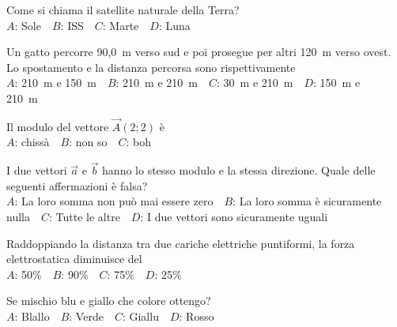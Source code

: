 \def\mcquestionnumber{8}


\mcquestionheader Come si chiama il satellite naturale della Terra?\\
{$A$}: Sole\ \ {$B$}: ISS\ \ {$C$}: Marte\ \ {$D$}: Luna\ \ 

\mcquestionfooter



\def\mcquestionnumber{9}


\mcquestionheader Un gatto percorre 90,0~m verso sud e poi prosegue per altri 120~m verso ovest. Lo spostamento e la distanza percorsa sono rispettivamente\\
{$A$}: 210~m e 150~m\ \ {$B$}: 210~m e 210~m\ \ {$C$}: 30~m e 210~m\ \ {$D$}: 150~m e 210~m\ \ 

\mcquestionfooter



\def\mcquestionnumber{10}


\mcquestionheader Il modulo del vettore $\vec{A}(2;2)$ è\\
{$A$}: chissà\ \ {$B$}: non so\ \ {$C$}: boh\ \ 

\mcquestionfooter



\def\mcquestionnumber{11}


\mcquestionheader I due vettori $\vec{a}$ e $\vec{b}$ hanno lo stesso modulo e la stessa direzione. Quale delle seguenti affermazioni è falsa?\\
{$A$}: La loro somma non può mai essere zero\ \ {$B$}: La loro somma è sicuramente nulla\ \ {$C$}: Tutte le altre\ \ {$D$}: I due vettori sono sicuramente uguali\ \ 

\mcquestionfooter



\def\mcquestionnumber{12}


\mcquestionheader Raddoppiando la distanza tra due cariche elettriche puntiformi, la forza elettrostatica diminuisce del\\
{$A$}: 50\%\ \ {$B$}: 90\%\ \ {$C$}: 75\%\ \ {$D$}: 25\%\ \ 

\mcquestionfooter



\mcpaperfooter

\def\mcserialnumber{32}
\mcpaperheader


\def\mcquestionnumber{1}


\mcquestionheader Se mischio blu e giallo che colore ottengo?\\
{$A$}: Blallo\ \ {$B$}: Verde\ \ {$C$}: Giallu\ \ {$D$}: Rosso\ \ 

